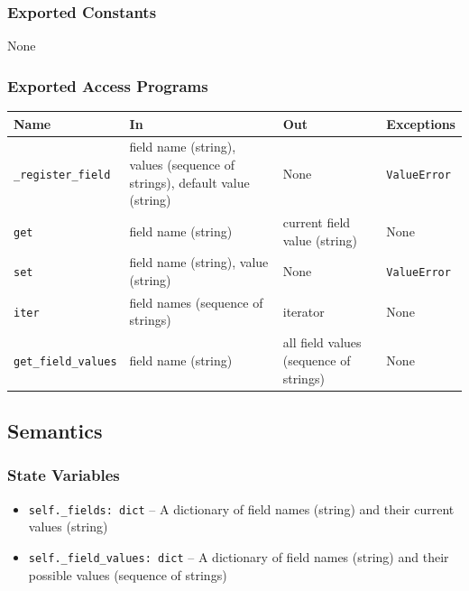 \documentclass[12pt, titlepage]{article}
\begin{document}
\subsubsection{Exported Constants}


None




\subsubsection{Exported Access Programs}


\begin{center}
\begin{tabular}{p{3cm} p{4cm} p{4cm} p{2cm}}
\hline
    \textbf{Name} & \textbf{In} & \textbf{Out} & \textbf{Exceptions} \\
\hline
    \lstinline|_register_field| & field name (string), values (sequence of strings), default value (string) & None & \lstinline|ValueError| \\
    \lstinline|get| & field name (string) & current field value (string) & None \\
    \lstinline|set| & field name (string), value (string) & None & \lstinline|ValueError| \\
    \lstinline|iter| & field names (sequence of strings) & iterator & None \\
    \lstinline|get_field_values| & field name (string) & all field values (sequence of strings) & None \\
\hline
\end{tabular}
\end{center}




\subsection{Semantics}


\subsubsection{State Variables}


\begin{itemize}
    \item \lstinline|self._fields: dict| -- A dictionary of field names (string) and their current values (string)
    \item \lstinline|self._field_values: dict| -- A dictionary of field names (string) and their possible values (sequence of strings)
\end{itemize}
\end{document}
